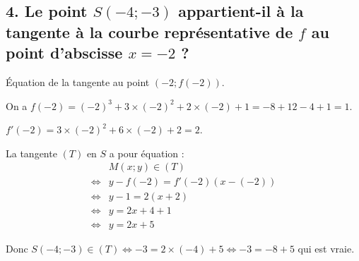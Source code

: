 	
	\subsection*{4. Le point $S(-4 ; -3)$ appartient-il à la tangente à la courbe représentative de $f$ au point d'abscisse $x = -2$ ?}
	
	Équation de la tangente au point $(-2 ; f(-2))$.
	
	On a $f(-2) = (-2)^3 + 3 \times (-2)^2 + 2 \times (-2) + 1 = -8 + 12 - 4 + 1 = 1$.
	
	$f'(-2) = 3 \times (-2)^2 + 6 \times (-2) + 2 = 2$.
	
	La tangente $(T)$ en $S$ a pour équation :
	\begin{align*}
&	M(x ; y) \in (T)\\
	 \iff& y - f(-2) = f'(-2)(x - (-2))\\
	 \iff& y - 1 = 2(x + 2)\\
	 \iff& y = 2x + 4 + 1 \\
	\iff &y = 2x + 5
	\end{align*}
	
	Donc $S(-4 ; -3) \in (T) \iff -3 = 2 \times (-4) + 5 \iff -3 = -8 + 5$ qui est vraie.
